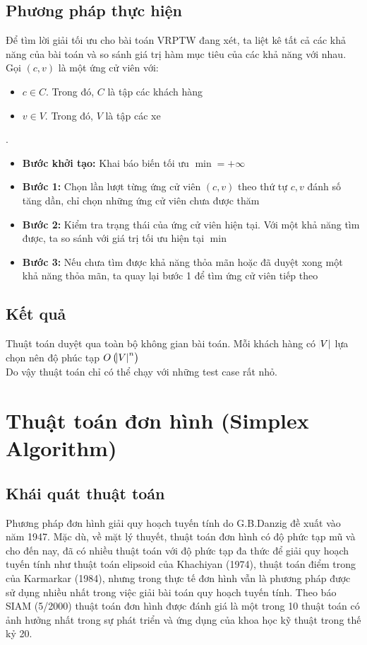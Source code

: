 \documentclass[12pt,a4paper]{article}\author{Nguyễn Nho Dũng}
\let\svsection\section
\def\section{\setcounter{figure}{0}\svsection}
\newcommand{\ngoacto}[1]{\left(#1\right)}
\begin{document}
\subsection{Phương pháp thực hiện}
Để tìm lời giải tối ưu cho bài toán VRPTW đang xét, ta liệt kê tất cả các khả năng của bài toán và so sánh giá trị hàm mục tiêu của các khả năng với nhau. Gọi $(c,v)$ là một ứng cử viên với:
\begin{itemize}
	\item $c\in C$. Trong đó, $C$ là tập các khách hàng
	\item $v\in V$. Trong đó, $V$ là tập các xe
\end{itemize}
\begin{thuattoan}
	.
	\begin{itemize}
		\item \textbf{Bước khởi tạo:} Khai báo biến tối ưu $\min = +\infty$
		\item \textbf{Bước 1:} Chọn lần lượt từng ứng cử viên $(c,v)$ theo thứ tự $c, v$ đánh số tăng dần, chỉ chọn những ứng cử viên chưa được thăm
		\item \textbf{Bước 2:} Kiểm tra trạng thái của ứng cử viên hiện tại. Với một khả năng tìm được, ta so sánh với giá trị tối ưu hiện tại $\min$
		\item \textbf{Bước 3:} Nếu chưa tìm được khả năng thỏa mãn hoặc đã duyệt xong một khả năng thỏa mãn, ta quay lại bước 1 để tìm ứng cử viên tiếp theo
	\end{itemize}
\end{thuattoan}
\subsection{Kết quả}
Thuật toán duyệt qua toàn bộ không gian bài toán. Mỗi khách hàng có $\abs{V}$ lựa chọn nên độ phúc tạp $O\ngoacto{\abs{V}^n}$\\
Do vậy thuật toán chỉ có thể chạy với những test case rất nhỏ. 
\newpage\section{Thuật toán đơn hình (Simplex Algorithm)}
\subsection{Khái quát thuật toán}
Phương pháp đơn hình giải quy hoạch tuyến tính do G.B.Danzig đề xuất vào năm 1947. Mặc dù, về mặt lý thuyết, thuật toán đơn hình có độ phức tạp mũ và cho đến nay, đã có nhiều thuật toán với độ phức tạp đa thức để giải quy hoạch tuyến tính như thuật toán elipsoid của Khachiyan (1974), thuật toán điểm trong của Karmarkar (1984), nhưng trong thực tế đơn hình vẫn là phương pháp được sử dụng nhiều nhất trong việc giải bài toán quy hoạch tuyến tính. Theo báo SIAM (5/2000) thuật toán đơn hình được đánh giá là một trong 10 thuật toán có ảnh hưởng nhất trong sự phát triển và ứng dụng của khoa học kỹ thuật trong thế kỷ 20.
\end{document}
